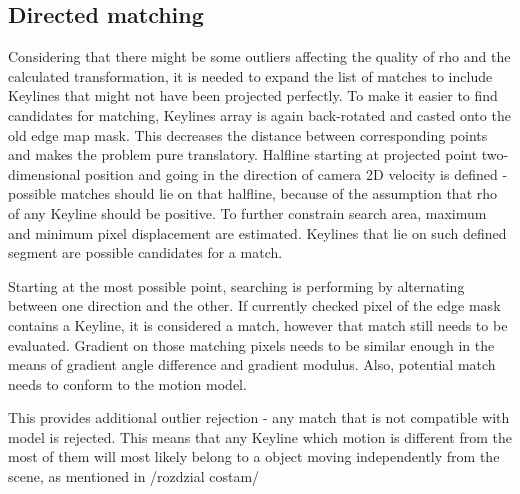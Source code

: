 \subsection{Directed matching}

%
%
%
%
%
%
Considering that there might be some outliers affecting the quality of rho and the calculated transformation, it is needed to expand the list of matches to include Keylines that might not have been projected perfectly.
To make it easier to find candidates for matching, Keylines array is again back-rotated and casted onto the old edge map mask. This decreases the distance between corresponding points and makes the problem pure translatory. Halfline starting at projected point two-dimensional position and going in the direction of camera 2D velocity is defined - possible matches should lie on that halfline, because of the assumption that rho of any Keyline should be positive. To further constrain search area, maximum and minimum pixel displacement are estimated. Keylines that lie on such defined segment are possible candidates for a match.

%
%
%
%
%
Starting at the most possible point, searching is performing by alternating between one direction and the other. If currently checked pixel of the edge mask contains a Keyline, it is considered a match, however that match still needs to be evaluated. Gradient on those matching pixels needs to be similar enough in the means of gradient angle difference and gradient modulus. Also, potential match needs to conform to the motion model.


This provides additional outlier rejection - any match that is not compatible with model is rejected. This means that any Keyline which motion is different from the most of them will most likely belong to a object moving independently from the scene, as mentioned in /rozdzial costam/ 

